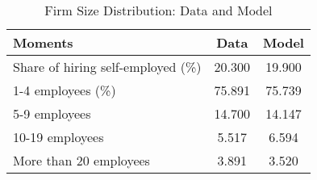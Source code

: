 \documentclass[a4paper,10pt]{article}
\begin{document}
 
\begin{table}[tbp] 
\caption{Firm Size Distribution: Data and Model \label{tab:firm_size_employees}} 
\begin{center} 
\begin{tabular}{lcc} 
\hline 
Moments                   & Data  & Model \\ 
\hline 
\hline 
Share of hiring self-employed (\%) &   20.300 &   19.900 \\ 
\hline 
1-4 employees (\%)    &   75.891 &   75.739 \\ 
5-9 employees           &   14.700 &   14.147 \\ 
10-19 employees         &    5.517 &    6.594 \\ 
More than 20 employees  &    3.891 &    3.520 \\ 
\hline 
\end{tabular} 
\end{center} 
\end{table} 
\end{document}

